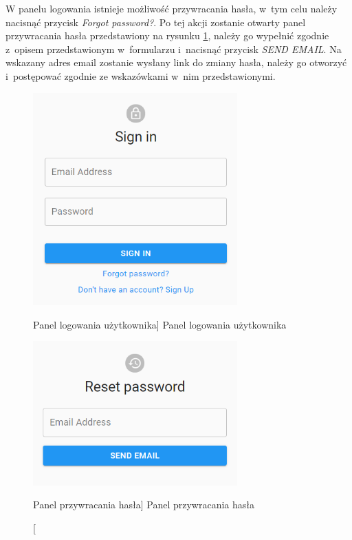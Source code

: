 \documentclass[../Kamil_Kowalewski_Main.tex]{subfiles}
\begin{document}
{{        W panelu logowania istnieje możliwość przywracania hasła, w~tym celu należy
        nacisnąć przycisk \textit{Forgot password?}. Po tej akcji zostanie otwarty
        panel przywracania hasła przedstawiony na rysunku
        \ref{chapter5:dok_uzytkownika:logowanie_rejestracja:reset_password},
        należy go wypełnić zgodnie z~opisem przedstawionym w~formularzu i~nacisnąć
        przycisk \textit{SEND EMAIL}. Na wskazany adres email zostanie wysłany link do
        zmiany hasła, należy go otworzyć i~postępować zgodnie ze wskazówkami w~nim
        przedstawionymi.
        \begin{figure}[H]
            \centering
            \begin{minipage}[b]{0.45\textwidth}
                \centering
                \includegraphics[width=0.7\textwidth, keepaspectratio]
                {img/chapter5/loginregister/login_panel.png}
                \caption
                [Panel logowania użytkownika]
                {Panel logowania użytkownika}
                \label{chapter5:dok_uzytkownika:logowanie_rejestracja:login_panel}
            \end{minipage}
            \hfill
            \begin{minipage}[b]{0.45\textwidth}
                \centering
                \includegraphics[width=0.7\textwidth, keepaspectratio]
                {img/chapter5/loginregister/reset_password.png}
                \caption
                [Panel przywracania hasła]
                {Panel przywracania hasła}
                \label{chapter5:dok_uzytkownika:logowanie_rejestracja:reset_password}
            \end{minipage}
        \end{figure}
    }

}
\end{document}
